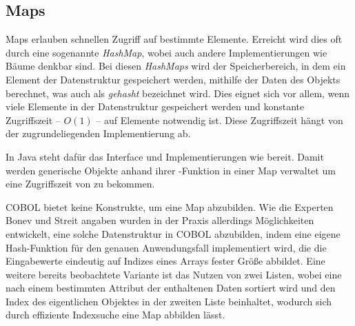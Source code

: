 \subsection{Maps}
Maps erlauben schnellen Zugriff auf bestimmte Elemente. Erreicht wird dies oft durch eine sogenannte \textit{HashMap}, wobei auch andere Implementierungen wie Bäume denkbar sind. Bei diesen \textit{HashMaps} wird der Speicherbereich, in dem ein Element der Datenstruktur gespeichert werden, mithilfe der Daten des Objekts berechnet, was auch als \textit{gehasht} bezeichnet wird. Dies eignet sich vor allem, wenn viele Elemente in der Datenstruktur gespeichert werden und konstante Zugriffszeit -- $O(1)$ -- auf Elemente notwendig ist. Diese Zugriffszeit hängt von der zugrundeliegenden Implementierung ab.

In Java steht dafür das Interface  und Implementierungen wie  bereit. Damit werden generische Objekte anhand ihrer -Funktion in einer Map verwaltet um eine Zugriffszeit von zu bekommen. 

COBOL bietet keine Konstrukte, um eine Map abzubilden. Wie die Experten Bonev und Streit angaben wurden in der Praxis allerdings Möglichkeiten entwickelt, eine solche Datenstruktur in COBOL abzubilden, indem \zB eine eigene Hash-Funktion für den genauen Anwendungsfall implementiert wird, die die Eingabewerte eindeutig auf Indizes eines Arrays fester Größe abbildet. Eine weitere bereits beobachtete Variante ist das Nutzen von zwei Listen, wobei eine nach einem bestimmten Attribut der enthaltenen Daten sortiert wird und den Index des eigentlichen Objektes in der zweiten Liste beinhaltet, wodurch sich durch effiziente Indexsuche eine Map abbilden lässt.